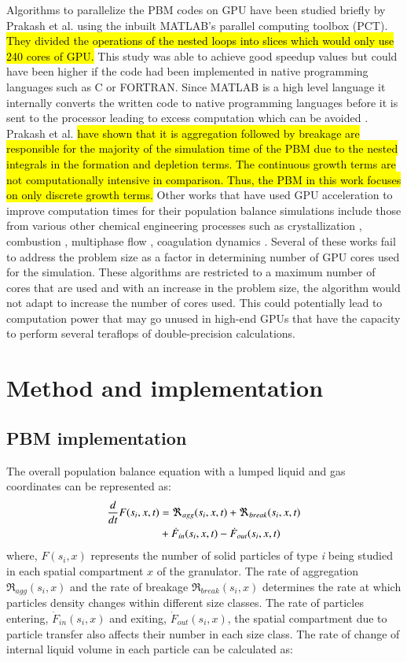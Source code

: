 \documentclass[review]{elsarticle}
\begin{document}
\begin{linenumbers}
Algorithms to parallelize the PBM codes on GPU have been studied briefly by Prakash et al.
\cite{Prakash2013b} using the inbuilt MATLAB's parallel computing toolbox (PCT).
\hl{They divided the operations of the nested loops into slices which would only use 240 cores of GPU.} 
This study was able to achieve good speedup values but could have been higher 
if the code had been implemented in native 
programming languages such as C or FORTRAN. Since MATLAB is a high level language it internally 
converts the written code to native programming languages before it is sent to the processor 
leading to excess computation which can be avoided \citep{pctMatlab}. Prakash et al. 
\cite{Prakash2013a} \hl{have shown that it is aggregation followed by breakage are responsible 
for the majority of the simulation time of the PBM due to the nested integrals in the formation 
and depletion terms. The continuous growth terms are not computationally intensive in 
comparison. Thus, the PBM in this work focuses on only discrete growth terms.} Other works that have 
used GPU acceleration to improve computation times for their population balance simulations 
include those from various other chemical engineering processes such as crystallization 
\citep{Szilagy2016}, combustion \citep{Shi2012} , multiphase flow \citep{santos2013}, 
coagulation dynamics \citep{Xu2015}. Several of these works fail to address the problem 
size as a factor in determining number of GPU cores used for the simulation. These algorithms 
are restricted to a maximum number of cores that are used and with an increase in the 
problem size, the algorithm would not adapt to increase the number of cores used. 
This could potentially lead to computation power that may go unused in high-end GPUs that 
have the capacity to perform several teraflops of double-precision calculations.


\section{Method and implementation}
\label{secMethods}
\subsection{PBM implementation}
The overall population balance equation with a lumped liquid and gas coordinates can be represented as:
\begin{align}
\frac{d}{dt}F(s_i,x,t)&=\Re_{agg}(s_i,x,t)+\Re_{break}(s_i,x,t)\notag\\ 
&+\dot{F}_{in}(s_i,x,t)-\dot{F}_{out}(s_i,x,t)
\label{eqn:mthds_pbm_overall} 
\end{align}
where, $F(s_i,x)$ represents the number of solid particles of type \textit{i} being studied in each spatial 
compartment $x$ of the granulator. The rate of aggregation $\Re_{agg}(s_i,x)$ 
and the rate of breakage $\Re_{break}(s_i,x)$ determines the rate at which particles density
changes within different size classes. The rate of particles entering, $\dot{F}_{in}(s_i,x)$ 
and exiting, $\dot{F}_{out}(s_i,x)$, the spatial compartment due to particle transfer also 
affects their number in each size class. The rate of change of internal liquid volume in each 
particle can be calculated as: 


\end{linenumbers}
\end{document}
